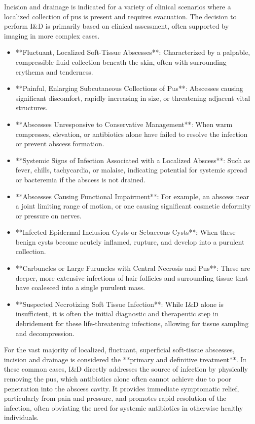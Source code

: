 Incision and drainage is indicated for a variety of clinical scenarios where a localized collection of pus is present and requires evacuation. The decision to perform I\&D is primarily based on clinical assessment, often supported by imaging in more complex cases.

\begin{itemize}
  \item **Fluctuant, Localized Soft-Tissue Abscesses**: Characterized by a palpable, compressible fluid collection beneath the skin, often with surrounding erythema and tenderness.
  \item **Painful, Enlarging Subcutaneous Collections of Pus**: Abscesses causing significant discomfort, rapidly increasing in size, or threatening adjacent vital structures.
  \item **Abscesses Unresponsive to Conservative Management**: When warm compresses, elevation, or antibiotics alone have failed to resolve the infection or prevent abscess formation.
  \item **Systemic Signs of Infection Associated with a Localized Abscess**: Such as fever, chills, tachycardia, or malaise, indicating potential for systemic spread or bacteremia if the abscess is not drained.
  \item **Abscesses Causing Functional Impairment**: For example, an abscess near a joint limiting range of motion, or one causing significant cosmetic deformity or pressure on nerves.
  \item **Infected Epidermal Inclusion Cysts or Sebaceous Cysts**: When these benign cysts become acutely inflamed, rupture, and develop into a purulent collection.
  \item **Carbuncles or Large Furuncles with Central Necrosis and Pus**: These are deeper, more extensive infections of hair follicles and surrounding tissue that have coalesced into a single purulent mass.
  \item **Suspected Necrotizing Soft Tissue Infection**: While I\&D alone is insufficient, it is often the initial diagnostic and therapeutic step in debridement for these life-threatening infections, allowing for tissue sampling and decompression.
\end{itemize}

For the vast majority of localized, fluctuant, superficial soft-tissue abscesses, incision and drainage is considered the **primary and definitive treatment**. In these common cases, I\&D directly addresses the source of infection by physically removing the pus, which antibiotics alone often cannot achieve due to poor penetration into the abscess cavity. It provides immediate symptomatic relief, particularly from pain and pressure, and promotes rapid resolution of the infection, often obviating the need for systemic antibiotics in otherwise healthy individuals.

